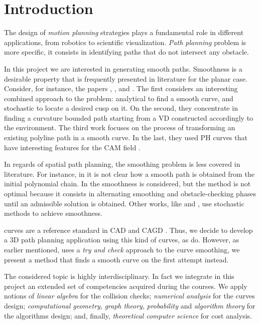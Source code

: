 \documentclass[dissertation.tex]{subfiles}
\begin{document}
\chapter{Introduction}
The design of \emph{motion planning} strategies plays a fundamental
role in different applications, from robotics to scientific
visualization. \emph{Path planning} problem is
more specific, it consists in identifying paths that do not
intersect any obstacle.

In this project we are interested in generating smooth
paths. Smoothness is a desirable property that is
frequently presented in literature for the planar case. Consider, for
instance, the papers \cite{maekawa}, \cite{ho-liu}, \cite{li} and
\cite{giannelli}. The first considers an interesting combined
approach to the problem: analytical to find a smooth curve, and
stochastic to locate a desired cusp on it. On the second, they
concentrate in finding a curvature bounded path starting from a
\acf{VD} constructed accordingly to the environment. The third work
focuses on
the process of transforming an existing polyline path in a smooth
curve. In the last, they used
\acf{PH} curves that have interesting features for the \acf{CAM} field
\cite{farouki}.

In regards of spatial path planning, the smoothing problem is less
covered in literature. For instance, in \cite{hrabar} it is not clear
how a smooth path is obtained from the initial polynomial chain. In
\cite{yang} the smoothness is considered, but the method is not
optimal because it consists in alternating smoothing and
obstacle-checking phases until an admissible solution is
obtained. Other works, like \cite{aghababa} and \cite{kroumov}, use 
stochastic methods to achieve smoothness.

\bs curves are a reference standard in \acf{CAD} and \acf{CAGD}
\cite{hughes}\cite{foley}\cite{farin}\cite{farin2}. Thus, we decide to
develop a 3D path planning application using this kind of curves, as
\cite{yang} do. However, as earlier mentioned,
\cite{yang} uses a \emph{try and check} approach to the curve
smoothing, we present a method that finds a smooth
curve on the first 
attempt instead.

The considered topic is highly interdisciplinary. In fact we integrate
in this project an extended set of
competencies acquired during the courses. We apply notions of
\emph{linear algebra} for the collision checks; \emph{numerical
  analysis} for the curves design; \emph{computational
  geometry},
\emph{graph theory}, \emph{probability} and \emph{algorithm theory}
for the algorithms design; and, finally, \emph{theoretical computer
  science} for cost analysis.
\end{document}
